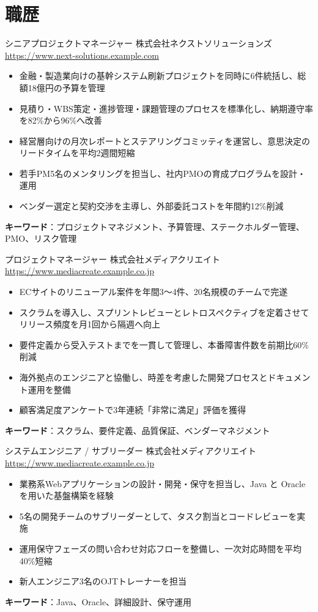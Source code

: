 \documentclass[a4paper, serif, 10pt]{moderncv}
\begin{document}
\section{職歴}

        {シニアプロジェクトマネージャー}
        {株式会社ネクストソリューションズ}
        {\url{https://www.next-solutions.example.com}}
        {}
        {\begin{itemize}
\item 金融・製造業向けの基幹システム刷新プロジェクトを同時に6件統括し、総額18億円の予算を管理
\item 見積り・WBS策定・進捗管理・課題管理のプロセスを標準化し、納期遵守率を82\%から96\%へ改善
\item 経営層向けの月次レポートとステアリングコミッティを運営し、意思決定のリードタイムを平均2週間短縮
\item 若手PM5名のメンタリングを担当し、社内PMOの育成プログラムを設計・運用
\item ベンダー選定と契約交渉を主導し、外部委託コストを年間約12\%削減
\end{itemize}
\textbf{キーワード}：プロジェクトマネジメント、予算管理、ステークホルダー管理、PMO、リスク管理}

        {プロジェクトマネージャー}
        {株式会社メディアクリエイト}
        {\url{https://www.mediacreate.example.co.jp}}
        {}
        {\begin{itemize}
\item ECサイトのリニューアル案件を年間3〜4件、20名規模のチームで完遂
\item スクラムを導入し、スプリントレビューとレトロスペクティブを定着させてリリース頻度を月1回から隔週へ向上
\item 要件定義から受入テストまでを一貫して管理し、本番障害件数を前期比60\%削減
\item 海外拠点のエンジニアと協働し、時差を考慮した開発プロセスとドキュメント運用を整備
\item 顧客満足度アンケートで3年連続「非常に満足」評価を獲得
\end{itemize}
\textbf{キーワード}：スクラム、要件定義、品質保証、ベンダーマネジメント}

        {システムエンジニア / サブリーダー}
        {株式会社メディアクリエイト}
        {\url{https://www.mediacreate.example.co.jp}}
        {}
        {\begin{itemize}
\item 業務系Webアプリケーションの設計・開発・保守を担当し、Java と Oracle を用いた基盤構築を経験
\item 5名の開発チームのサブリーダーとして、タスク割当とコードレビューを実施
\item 運用保守フェーズの問い合わせ対応フローを整備し、一次対応時間を平均40\%短縮
\item 新人エンジニア3名のOJTトレーナーを担当
\end{itemize}
\textbf{キーワード}：Java、Oracle、詳細設計、保守運用}
\end{document}
